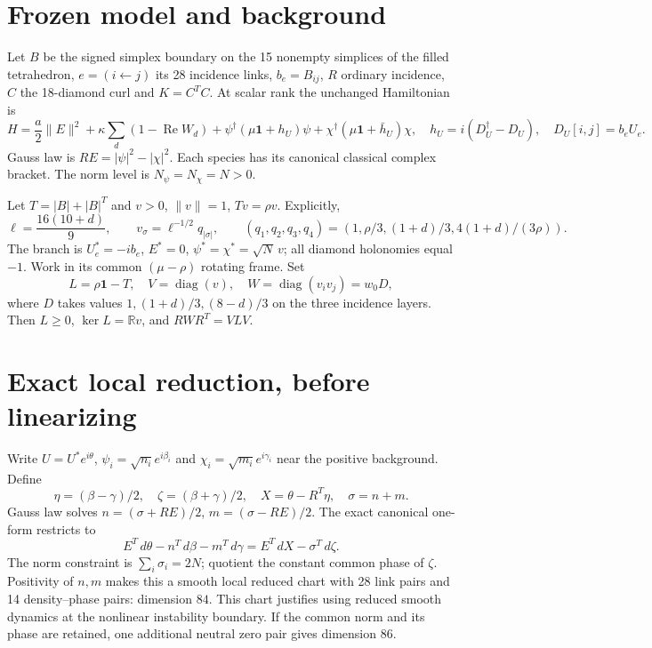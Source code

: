 \documentclass[11pt,a4paper]{article}
\newcommand{\id}{\mathbf1}\newcommand{\tr}{\operatorname{tr}}\newcommand{\diag}{\operatorname{diag}}\newcommand{\Rea}{\operatorname{Re}}
\begin{document}
\newpage
\section{Frozen model and background}
Let $B$ be the signed simplex boundary on the 15 nonempty simplices of the filled tetrahedron, $e=(i\leftarrow j)$ its 28 incidence links, $b_e=B_{ij}$, $R$ ordinary incidence, $C$ the 18-diamond curl and $K=C^TC$. At scalar rank the unchanged Hamiltonian is
\[
H=\frac a2\|E\|^2+\kappa\sum_d(1-\Rea W_d)
+\psi^\dagger(\mu\id+h_U)\psi+\chi^\dagger(\mu\id+\bar h_U)\chi,
\quad h_U=i(D_U^\dagger-D_U),\quad D_U[i,j]=b_eU_e.
\]
Gauss law is $RE=|\psi|^2-|\chi|^2$. Each species has its canonical classical complex bracket. The norm level is $N_\psi=N_\chi=N>0$.

Let $T=|B|+|B|^T$ and $v>0$, $\|v\|=1$, $Tv=\rho v$. Explicitly,
\[
\ell=\frac{16(10+d)}9,\qquad
v_\sigma=\ell^{-1/2}q_{|\sigma|},\qquad
(q_1,q_2,q_3,q_4)=\left(1,\rho/3,(1+d)/3,4(1+d)/(3\rho)\right).
\]
The branch is $U_e^*=-ib_e$, $E^*=0$, $\psi^*=\chi^*=\sqrt N\,v$; all diamond holonomies equal $-1$. Work in its common $(\mu-\rho)$ rotating frame. Set
\[
L=\rho\id-T,\quad V=\diag(v),\quad
W=\diag(v_iv_j)=w_0D,
\]
where $D$ takes values $1,(1+d)/3,(8-d)/3$ on the three incidence layers. Then $L\geq0$, $\ker L=\mathbb Rv$, and $RWR^T=VLV$.

\section{Exact local reduction, before linearizing}
Write $U=U^*e^{i\theta}$, $\psi_i=\sqrt{n_i}e^{i\beta_i}$ and $\chi_i=\sqrt{m_i}e^{i\gamma_i}$ near the positive background. Define
\[
\eta=(\beta-\gamma)/2,\quad\zeta=(\beta+\gamma)/2,\quad
X=\theta-R^T\eta,\quad \sigma=n+m.
\]
Gauss law solves $n=(\sigma+RE)/2$, $m=(\sigma-RE)/2$. The exact canonical one-form restricts to
\[
E^T\,d\theta-n^T\,d\beta-m^T\,d\gamma
=E^T\,dX-\sigma^T\,d\zeta.
\]
The norm constraint is $\sum_i\sigma_i=2N$; quotient the constant common phase of $\zeta$. Positivity of $n,m$ makes this a smooth local reduced chart with 28 link pairs and 14 density--phase pairs: dimension $84$. This chart justifies using reduced smooth dynamics at the nonlinear instability boundary. If the common norm and its phase are retained, one additional neutral zero pair gives dimension $86$.

\newpage
\end{document}
